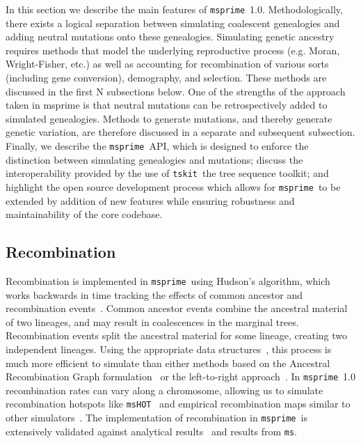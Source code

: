 \documentclass{article}
\newcommand{\msprime}[0]{\texttt{msprime}}
\newcommand{\tskit}[0]{\texttt{tskit}}
\newcommand{\ms}[0]{\texttt{ms}}
\begin{document}
In this section we describe the main features of \msprime\ 1.0. Methodologically,
there exists a logical separation between simulating coalescent genealogies and
adding neutral mutations onto these genealogies. Simulating genetic ancestry
requires methods that model the underlying reproductive process (e.g. Moran,
Wright-Fisher, etc.) as well as accounting for recombination of various sorts
(including gene conversion), demography, and selection. These methods are
discussed in the first N subsections below. One of the strengths of the
approach taken in msprime is that neutral mutations can be retrospectively
added to simulated genealogies. Methods to generate mutations, and thereby
generate genetic variation, are therefore discussed in a separate and subsequent
subsection. Finally, we describe the \msprime\ API, which is designed to enforce
the distinction between simulating genealogies and mutations; discuss the
interoperability provided by the use of \tskit\, the tree sequence toolkit;
and highlight the open source development process which allows for \msprime\
to be extended by addition of new features while ensuring robustness and
maintainability of the core codebase.


\subsection{Recombination}

Recombination is implemented in \msprime\ using Hudson's algorithm, which
works backwards in time tracking the
effects of common ancestor and recombination
events~\citep{hudson1983properties,hudson1990gene,kelleher2016efficient}.
Common ancestor events combine the ancestral material of two lineages, and may
result in coalescences in the marginal trees. Recombination events
split the ancestral material for some lineage, creating two independent
lineages. Using the appropriate data structures~\citep{kelleher2016efficient},
this process is much more efficient to simulate than either
methods based on the Ancestral Recombination Graph
formulation~\citep{griffiths1991two,griffiths1997ancestral}
or the left-to-right approach~\citep{wiuf1999recombination,wiuf1999ancestry}.
In \msprime\ 1.0 recombination rates can vary along a chromosome, allowing
us to simulate recombination hotspots like \texttt{msHOT}~\citep{hellenthal2007mshot}
and empirical recombination maps similar to other
simulators~\citep[e.g.][]{shlyakhter2014cosi2}.
The implementation of recombination in \msprime\ is extensively validated
against analytical results~\citep{hudson1983properties,kaplan1985use}
and results from \ms.
\end{document}
